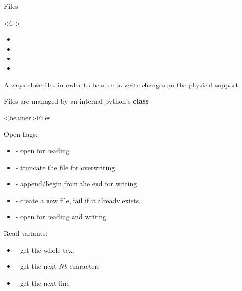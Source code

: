 \begin{frame}[fragile]{Files}
  \begin{onlyenv}<6->
    \begin{itemize}
      \item {}
      \item {}
      \item {}
      \item {}
    \end{itemize}
  \end{onlyenv}

  \bigskip

   Always close files in order to be sure to write changes on the physical support

  \bigskip

   Files are managed by an internal python's \textbf{class}

\end{frame}

\begin{frame}<beamer>{Files}

  Open flags:

  \begin{itemize}
    \item<2->  - open for reading
    \item<3->  - truncate the file for overwriting
    \item<4->  - append/begin from the end for writing
    \item<5->  - create a new file, fail if it already exists
    \item<6->  - open for reading and writing
  \end{itemize}

  \bigskip

   Read variants:

  \begin{itemize}
    \item<8->  - get the whole text
    \item<9->  - get the next \textit{Nb} characters
    \item<10->  - get the next line
  \end{itemize}

\end{frame}



